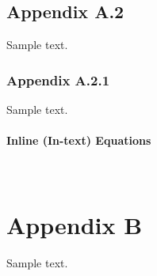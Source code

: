 \documentclass[acmtog, authorversion]{acmart}
\begin{document}
\subsection{Appendix A.2}
Sample text.
\subsubsection{Appendix A.2.1}
Sample text.

\paragraph{Inline (In-text) Equations}
\
\section{Appendix B}
Sample text.
\end{document}
